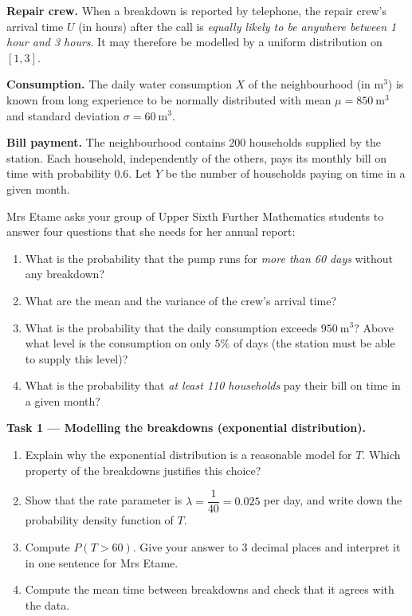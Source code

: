 \documentclass[11pt]{article}
\newcounter{popsec}
\newcounter{popsub}
\newcommand{\courssub}[1]{%
  \stepcounter{popsub}%
  \par\vspace{9pt}\noindent{\popxbold\fontsize{11.5}{13}\selectfont\color{popink}{\color{poporange}\thepopsec.\thepopsub}\hspace{6pt}#1}\par\nopagebreak\vspace{4pt}
}
\begin{document}
\textbf{Repair crew.} When a breakdown is reported by telephone, the repair crew's arrival time $U$ (in hours) after the call is \emph{equally likely to be anywhere between 1 hour and 3 hours}. It may therefore be modelled by a uniform distribution on $[1,3]$.

\textbf{Consumption.} The daily water consumption $X$ of the neighbourhood (in $\mathrm{m^3}$) is known from long experience to be normally distributed with mean $\mu=850\ \mathrm{m^3}$ and standard deviation $\sigma=60\ \mathrm{m^3}$.

\textbf{Bill payment.} The neighbourhood contains $200$ households supplied by the station. Each household, independently of the others, pays its monthly bill on time with probability $0.6$. Let $Y$ be the number of households paying on time in a given month.

Mrs Etame asks your group of Upper Sixth Further Mathematics students to answer four questions that she needs for her annual report:

\begin{enumerate}
\item What is the probability that the pump runs for \emph{more than 60 days} without any breakdown?
\item What are the mean and the variance of the crew's arrival time?
\item What is the probability that the daily consumption exceeds $950\ \mathrm{m^3}$? Above what level is the consumption on only $5\%$ of days (the station must be able to supply this level)?
\item What is the probability that \emph{at least 110 households} pay their bill on time in a given month?
\end{enumerate}

\courssub{Tasks}

\textbf{Task 1 — Modelling the breakdowns (exponential distribution).}\par
\begin{enumerate}
\item Explain why the exponential distribution is a reasonable model for $T$. Which property of the breakdowns justifies this choice?
\item Show that the rate parameter is $\lambda=\dfrac{1}{40}=0.025$ per day, and write down the probability density function of $T$.
\item Compute $P(T>60)$. Give your answer to 3 decimal places and interpret it in one sentence for Mrs Etame.
\item Compute the mean time between breakdowns and check that it agrees with the data.
\end{enumerate}
\end{document}
